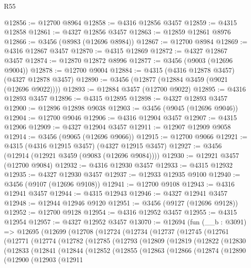 \begin{lexlean}{R55}
\begin{coremodule}
@12856 := @12700 @8964
@12858 := @4316 @12856 @3457
@12859 := @4315 @12858
@12861 := @4327 @12856 @3457
@12863 := @12859 @12861 @8976
@12866 := @3456 (@8983 (@12696 @8984))
@12867 := @12700 @8984
@12869 := @4316 @12867 @3457
@12870 := @4315 @12869
@12872 := @4327 @12867 @3457
@12874 := @12870 @12872 @8996
@12877 := @3456 (@9003 (@12696 @9004))
@12878 := @12700 @9004
@12884 := @4315 (@4316 @12878 @3457) (@4327 @12878 @3457)
@12890 := @3456 (@12877 (@12884 @3459 (@9021 (@12696 @9022))))
@12893 := @12884 @3457 (@12700 @9022)
@12895 := @4316 @12893 @3457
@12896 := @4315 @12895
@12898 := @4327 @12893 @3457
@12900 := @12896 @12898 @9038
@12903 := @3456 (@9045 (@12696 @9046))
@12904 := @12700 @9046
@12906 := @4316 @12904 @3457
@12907 := @4315 @12906
@12909 := @4327 @12904 @3457
@12911 := @12907 @12909 @9058
@12914 := @3456 (@9065 (@12696 @9066))
@12915 := @12700 @9066
@12921 := @4315 (@4316 @12915 @3457) (@4327 @12915 @3457)
@12927 := @3456 (@12914 (@12921 @3459 (@9083 (@12696 @9084))))
@12930 := @12921 @3457 (@12700 @9084)
@12932 := @4316 @12930 @3457
@12933 := @4315 @12932
@12935 := @4327 @12930 @3457
@12937 := @12933 @12935 @9100
@12940 := @3456 (@9107 (@12696 @9108))
@12941 := @12700 @9108
@12943 := @4316 @12941 @3457
@12944 := @4315 @12943
@12946 := @4327 @12941 @3457
@12948 := @12944 @12946 @9120
@12951 := @3456 (@9127 (@12696 @9128))
@12952 := @12700 @9128
@12954 := @4316 @12952 @3457
@12955 := @4315 @12954
@12957 := @4327 @12952 @3457
@13070 := @12694
    (fun (__b : @3091) =>
    @12695
      (@12699
        (@12708
          (@12724
            (@12734
              (@12737
                (@12745
                  (@12761
                    (@12771
                      (@12774
                        (@12782
                          (@12785
                            (@12793
                              (@12809
                                (@12819
                                  (@12822
                                    (@12830
                                      (@12833
                                        (@12841
                                          (@12844
                                            (@12852
                                              (@12855
                                                (@12863
                                                  (@12866
                                                    (@12874
                                                      (@12890
                                                        (@12900
                                                          (@12903
                                                            (@12911

\end{coremodule}
\end{lexlean}
